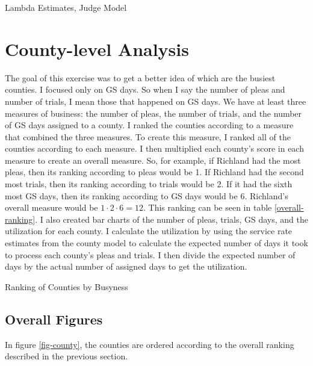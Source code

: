 \documentclass[11pt]{article}
\begin{document}
    \begin{table}[H]
      \centering
      \small
      \caption{Lambda Estimates, Judge Model}
      \label{judge-lambda}
      
    \end{table}

\section{County-level Analysis}
  The goal of this exercise was to get a better idea of which are the busiest counties.
  I focused only on GS days. So when I say the number of pleas and number of trials, I mean those that
  happened on GS days.
  We have at least three measures of business: the number of pleas, the number of trials, and
  the number of GS days assigned to a county. I ranked the counties according to a measure
  that combined the three measures. To create this measure, I ranked all of the counties according
  to each measure. I then multiplied each county's score in each measure to create an overall measure.
  So, for example, if Richland had the most pleas, then its ranking according to pleas would be 1. If Richland had the second most trials, then its ranking according to trials would be 2. If it had the sixth most GS days, then its ranking according to GS days would be 6. Richland's overall measure would be $1 \cdot 2 \cdot 6 = 12$. This ranking can be seen in table \ref{overall-ranking}. I also created bar charts of the number of pleas, trials, GS days, and the utilization for each county. I calculate the utilization by using the service rate estimates from the county model to calculate the expected number of days it took to process each county's pleas and trials. I then divide the expected number of days by the actual number of assigned days to get the utilization.

  \begin{table}[H]
    \centering
    \small
    \caption{Ranking of Counties by Busyness}
    \label{overall-ranking}
    
  \end{table}

  \subsection{Overall Figures}
   In figure \ref{fig-county}, the counties are ordered according to the overall ranking described in the previous section.
\end{document}
